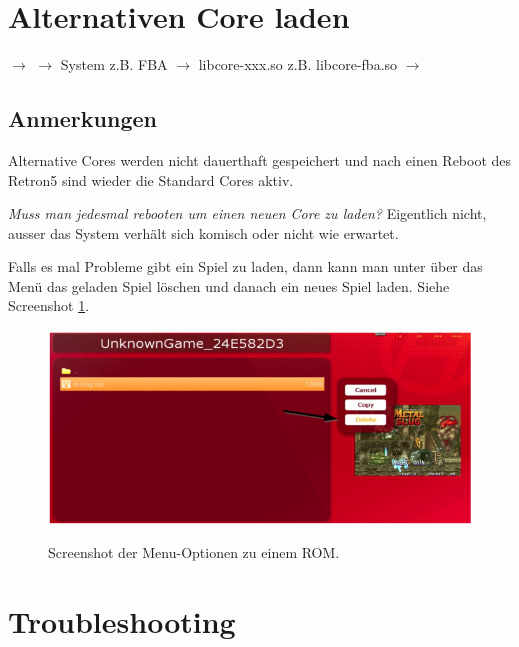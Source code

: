 \documentclass[a4paper]{article}
\begin{document}
\section{Alternativen Core laden}

 $\rightarrow$  $\rightarrow$ System z.B. FBA $\rightarrow$ libcore-xxx.so z.B. libcore-fba.so $\rightarrow$ 

\subsection{Anmerkungen}

Alternative Cores werden nicht dauerthaft gespeichert und nach einen Reboot des Retron5 sind wieder die Standard Cores aktiv.

\emph{Muss man jedesmal rebooten um einen neuen Core zu laden?} Eigentlich nicht, ausser das System verh\"alt sich komisch oder nicht wie erwartet.

Falls es mal Probleme gibt ein Spiel zu laden, dann kann man unter  \"uber das Men\"u das geladen Spiel l\"oschen und danach ein neues Spiel laden. Siehe Screenshot \ref{fig:unknown-game}.

\begin{figure}[h]
\caption{Screenshot der Menu-Optionen zu einem ROM.}
\includegraphics[width=\textwidth]{unknown-game}
\label{fig:unknown-game}
\end{figure}


\section{Troubleshooting}
\end{document}
